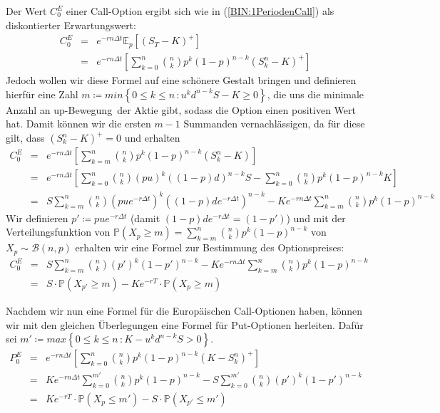 Der Wert $ C_0^E $ einer Call-Option ergibt sich wie in (\ref{BIN:1PeriodenCall}) als diskontierter Erwartungswert:
\begin{eqnarray}
C_0^E & = & e^{-rn\Delta t} \mathbb{E}_p \left[\left(S_T - K\right)^+\right] \nonumber \\
    & = & e^{-rn\Delta t} \left[ \sum_{k=0}^n \binom{n}{k} p^k \left( 1-p \right)^{n-k} \left(S^n_k - K \right) ^{+} \right]		
\end{eqnarray}
Jedoch wollen wir diese Formel auf eine schönere Gestalt bringen und definieren hierfür eine Zahl $m \coloneqq min\left\{0 \leq k \leq n \, \colon u^kd^{n-k}S - K \geq 0 \right\}$, die uns die minimale Anzahl an \glqq up-Bewegung\grqq \, der Aktie gibt, sodass die Option einen positiven Wert hat. Damit können wir die ersten $m-1$ Summanden vernachlässigen, da für diese gilt, dass $\left(S_k^n-K\right)^+ = 0$ und erhalten
\begin{eqnarray*}
C_0^E & = & e^{-rn\Delta t} \left[ \sum_{k=m}^n \binom{n}{k} p^k \left( 1-p \right)^{n-k} \left(S^n_k - K \right) \right] \\
    & = & e^{-rn\Delta t}\left[\sum_{k=0}^n \binom{n}{k} (pu)^k \left( (1-p)d \right)^{n-k}S - \sum_{k=0}^n \binom{n}{k} p^k \left( 1-p \right)^{n-k}K\right] \\
    & = & S \sum_{k=m}^n \binom{n}{k} \left(pue^{-r\Delta t} \right)^k \left( (1-p)de^{-r\Delta t}  \right)^{n-k} - Ke^{-rn\Delta t} \sum_{k=m}^n \binom{n}{k} p^k \left( 1-p \right)^{n-k}
\end{eqnarray*}
Wir definieren $p' \coloneqq pue^{-r\Delta t}$ (damit $(1-p)de^{-r\Delta t} = (1-p')$) und mit der Verteilungsfunktion von $ \mathbb{P}\left(X_p \geq m\right) = \sum_{k=m}^n \binom{n}{k} p^k \left( 1-p \right)^{n-k}$ von $ X_p \sim \mathcal{B}(n,p)$ erhalten wir eine Formel zur Bestimmung des Optionspreises:
\begin{eqnarray}
C_0^E & = 	&  S\sum_{k=m}^n \binom{n}{k} \left(p'\right)^k \left( 1-p'  \right)^{n-k} - Ke^{-rn\Delta t} \sum_{k=m}^n \binom{n}{k} p^k \left( 1-p \right)^{n-k} \nonumber  \\ 
    & = 	& S \cdot \mathbb{P}\left(X_{p'} \geq m\right) - Ke^{-rT} \cdot \mathbb{P}\left(X_p \geq m\right) \label{BIN:calloption}
\end{eqnarray}

Nachdem wir nun eine Formel für die Europäischen Call-Optionen haben, können wir mit den gleichen Überlegungen eine Formel für Put-Optionen herleiten. Dafür sei $m' \coloneqq max\left\{0 \leq k \leq n \, \colon K - u^kd^{n-k}S > 0 \right\}$.
\begin{eqnarray*}
P_0^E & = & e^{-rn\Delta t} \left[ \sum_{k=0}^n \binom{n}{k} p^k \left( 1-p \right)^{n-k} \left(K - S^n_k \right)^+ \right] \\
    & = & Ke^{-rn\Delta t} \sum_{k=0}^{m'} \binom{n}{k} p^k \left( 1-p \right)^{n-k} - S \sum_{k=0}^{m'} \binom{n}{k} \left(p'\right)^k \left(1-p'\right)^{n-k} \\
    & = & Ke^{-rT} \cdot \mathbb{P}\left(X_{p} \leq m'\right)  - S \cdot \mathbb{P}\left(X_{p'} \leq m'\right)
\end{eqnarray*}




